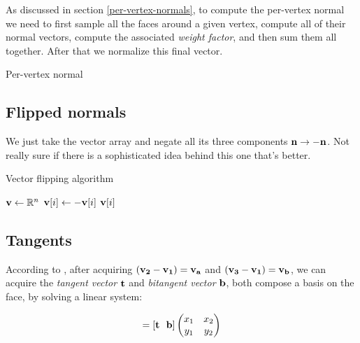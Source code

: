 As discussed in section \ref{per-vertex-normals}, to compute
the  per-vertex normal we need to first sample all the faces
around a given vertex, compute all of their normal vectors,
compute the associated \emph{weight factor}, and then
sum them all together. After that we normalize this final
vector.

\begin{algorithm}
\caption{Per-vertex normal}
\begin{algorithmic}[1]

\EndProcedure
\end{algorithmic}
\end{algorithm}

\subsection{Flipped normals}

We just take the vector array and negate all its
three components $\bf{n \rightarrow -n}$.
Not really sure if there is a sophisticated idea behind
this one that's better.

\begin{algorithm}
\caption{Vector flipping algorithm}
\begin{algorithmic}[1]
\State $\bf{v} \gets \RR^n$ 
    \State $\bf{v}[i] \gets -\bf{v}[i]$ 
    \State \Return $\bf{v}[i]$ 
    \EndFor  
\EndProcedure
\end{algorithmic}
\end{algorithm}

\subsection{Tangents}

According to \cite{tangent1, tangent2, foundationsofgameengine1}, after
acquiring $\bf{(v_2-v_1)=v_a}$ and $\bf{(v_3-v_1)=v_b}$,
we can acquire the \emph{tangent vector} $\bf{t}$
and \emph{bitangent vector} $\bf{b}$, both compose a
basis on the face, by solving a linear system:

\begin{align*}
    [\bf{v_a} \ \bf{v_b}] = [\bf{t  \ \ b}]
    \begin{pmatrix}
 x_1 & x_2 \\
 y_1  & y_2
\end{pmatrix}
\end{align*}

